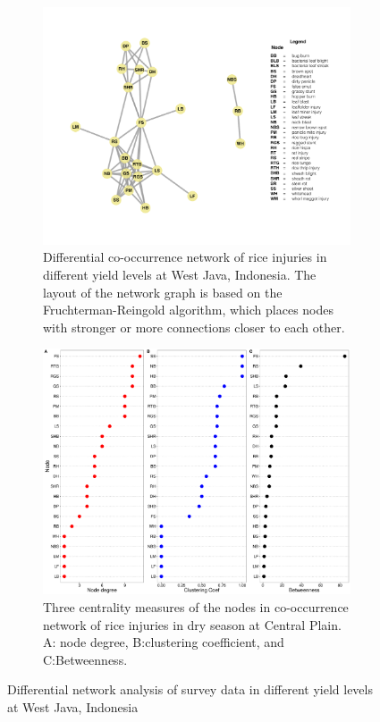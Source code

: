   
 \begin{figure}
    \centering
    \begin{subfigure}[b]{1\textwidth}
        \includegraphics[width = 1\textwidth]{figures/difyieldWJ/difyieldWJ.pdf}
        \caption[Differential co-occurrence network of rice injuries in different yield levels at West Java, Indonesia.]{Differential co-occurrence network of rice injuries in different yield levels at West Java, Indonesia. The layout of the network graph is based on the Fruchterman-Reingold algorithm, which places nodes with stronger or more connections closer to each other.}
        \label{fig:difyieldnetwork_WJ}
    \end{subfigure}
    \begin{subfigure}[b]{1\textwidth}
        \includegraphics[width = 1\textwidth]{figures/yield_dif_nodepropWest_Java/yield_dif_nodepropWest_Java.pdf}
        \caption{Three centrality measures of the nodes in co-occurrence network of rice injuries in dry season at Central Plain. A: node degree, B:clustering coefficient, and C:Betweenness.}
        \label{fig:nodepropdifyield_WJ}
    \end{subfigure}
    \caption{Differential network analysis of survey data in different yield levels at West Java, Indonesia}
    \label{fig:yielddif_WJ}
\end{figure}


